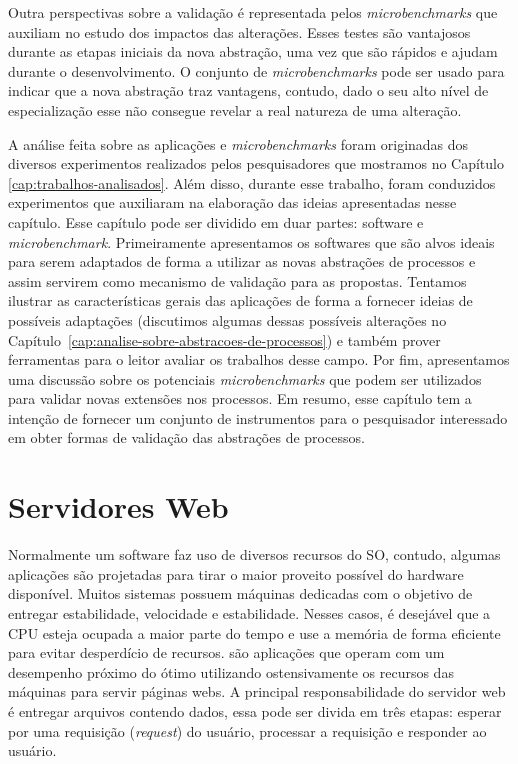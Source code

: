 Outra perspectivas sobre a validação é representada pelos
\textit{microbenchmarks} que auxiliam no estudo dos impactos das alterações.
Esses testes são vantajosos durante as etapas iniciais da nova abstração, uma
vez que são rápidos e ajudam durante o desenvolvimento. O conjunto de
\textit{microbenchmarks} pode ser usado para indicar que a nova abstração
traz vantagens, contudo, dado o seu alto nível de especialização esse não
consegue revelar a real natureza de uma alteração.

A análise feita sobre as aplicações e \textit{microbenchmarks} foram originadas
dos diversos experimentos realizados pelos pesquisadores que mostramos no
Capítulo \ref{cap:trabalhos-analisados}. Além disso, durante esse trabalho,
foram conduzidos experimentos que auxiliaram na elaboração das ideias
apresentadas nesse capítulo. Esse capítulo pode ser dividido em duar partes:
software e \textit{microbenchmark}. Primeiramente apresentamos os softwares que
são alvos ideais para serem adaptados de forma a utilizar as novas abstrações
de processos e assim servirem como mecanismo de validação para as propostas.
Tentamos ilustrar as características gerais das aplicações de forma a fornecer
ideias de possíveis adaptações (discutimos algumas dessas possíveis alterações
no Capítulo~\ref{cap:analise-sobre-abstracoes-de-processos}) e também prover
ferramentas para o leitor avaliar os trabalhos desse campo. Por fim,
apresentamos uma discussão sobre os potenciais \emph{microbenchmarks} que podem
ser utilizados para validar novas extensões nos processos. Em resumo, esse
capítulo tem a intenção de fornecer um conjunto de instrumentos para o
pesquisador interessado em obter formas de validação das abstrações de
processos.

\section{Servidores Web}
\label{sec:web_server}

Normalmente um software faz uso de diversos recursos do SO, contudo, algumas
aplicações são projetadas para tirar o maior proveito possível do hardware
disponível. Muitos sistemas possuem máquinas dedicadas com o objetivo de
entregar estabilidade, velocidade e estabilidade. Nesses casos, é desejável que
a CPU esteja ocupada a maior parte do tempo e use a memória de forma eficiente
para evitar desperdício de recursos.  são aplicações que operam com um desempenho próximo
do ótimo utilizando ostensivamente os recursos das máquinas para servir páginas
webs. A principal responsabilidade do servidor web é entregar arquivos contendo
dados, essa pode ser divida em três etapas: esperar por uma requisição
(\textit{request}) do usuário, processar a requisição e responder ao usuário.

